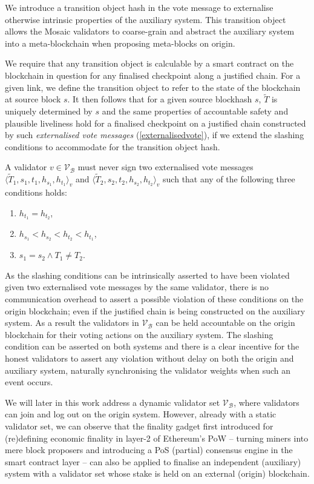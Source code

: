 \documentclass[12pt,a4paper]{article}
\begin{document}
We introduce a transition object hash in the vote message to externalise otherwise intrinsic properties of the auxiliary system.
This transition object allows the Mosaic validators to coarse-grain and abstract the auxiliary system into a meta-blockchain when proposing meta-blocks on origin.

We require that any transition object is calculable by a smart contract on the blockchain in question for any finalised checkpoint along a justified chain.
For a given link, we define the transition object to refer to the state of the blockchain at source block $s$. %
It then follows that for a given source blockhash $s$, $\tilde{T}$ is uniquely determined by $s$ and the same properties of accountable safety and plausible liveliness hold for a finalised checkpoint on a justified chain constructed by such \emph{externalised vote messages} (\ref{externalisedvote}), if we extend the slashing conditions to accommodate for the transition object hash.

A validator $v \in \mathcal{V}_\mathcal{B}$ must never sign two externalised vote messages $\langle \tilde{T}_1, s_1, t_1, h_{s_1}, h_{t_1}\rangle_v$ and $\langle \tilde{T}_2, s_2, t_2, h_{s_2}, h_{t_2}\rangle_v$ such that any of the following three conditions holds:
\begin{enumerate}
  \item $h_{t_1} = h_{t_2}$,
  \item $h_{s_1} < h_{s_2} < h_{t_2} < h_{t_1}$,
  \item $s_1 = s_2 \land T_1 \neq T_2$.
\end{enumerate}

As the slashing conditions can be intrinsically asserted to have been violated given two externalised vote messages by the same validator, there is no communication overhead to assert a possible violation of these conditions on the origin blockchain; even if the justified chain is being constructed on the auxiliary system.
As a result the validators in $\mathcal{V}_\mathcal{B}$ can be held accountable on the origin blockchain for their voting actions on the auxiliary system.
The slashing condition can be asserted on both systems and there is a clear incentive for the honest validators to assert any violation without delay on both the origin and auxiliary system, naturally synchronising the validator weights when such an event occurs.

We will later in this work address a dynamic validator set $\mathcal{V}_\mathcal{B}$, where validators can join and log out on the origin system.
However, already with a static validator set, we can observe that the finality gadget first introduced for (re)defining economic finality in layer-2 of Ethereum's PoW -- turning miners into mere block proposers and introducing a PoS (partial) consensus engine in the smart contract layer -- can also be applied to finalise an independent (auxiliary) system with a validator set whose stake is held on an external (origin) blockchain.
\end{document}
